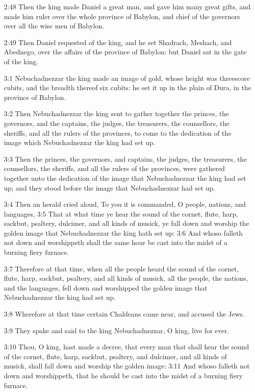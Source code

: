 2:48 Then the king made Daniel a great man, and gave him many great gifts, and made him ruler over the whole province of Babylon, and chief of the governors over all the wise men of Babylon.

2:49 Then Daniel requested of the king, and he set Shadrach, Meshach, and Abednego, over the affairs of the province of Babylon: but Daniel sat in the gate of the king.

3:1 Nebuchadnezzar the king made an image of gold, whose height was threescore cubits, and the breadth thereof six cubits: he set it up in the plain of Dura, in the province of Babylon.

3:2 Then Nebuchadnezzar the king sent to gather together the princes, the governors, and the captains, the judges, the treasurers, the counsellors, the sheriffs, and all the rulers of the provinces, to come to the dedication of the image which Nebuchadnezzar the king had set up.

3:3 Then the princes, the governors, and captains, the judges, the treasurers, the counsellors, the sheriffs, and all the rulers of the provinces, were gathered together unto the dedication of the image that Nebuchadnezzar the king had set up; and they stood before the image that Nebuchadnezzar had set up.

3:4 Then an herald cried aloud, To you it is commanded, O people, nations, and languages, 3:5 That at what time ye hear the sound of the cornet, flute, harp, sackbut, psaltery, dulcimer, and all kinds of musick, ye fall down and worship the golden image that Nebuchadnezzar the king hath set up: 3:6 And whoso falleth not down and worshippeth shall the same hour be cast into the midst of a burning fiery furnace.

3:7 Therefore at that time, when all the people heard the sound of the cornet, flute, harp, sackbut, psaltery, and all kinds of musick, all the people, the nations, and the languages, fell down and worshipped the golden image that Nebuchadnezzar the king had set up.

3:8 Wherefore at that time certain Chaldeans came near, and accused the Jews.

3:9 They spake and said to the king Nebuchadnezzar, O king, live for ever.

3:10 Thou, O king, hast made a decree, that every man that shall hear the sound of the cornet, flute, harp, sackbut, psaltery, and dulcimer, and all kinds of musick, shall fall down and worship the golden image: 3:11 And whoso falleth not down and worshippeth, that he should be cast into the midst of a burning fiery furnace.

